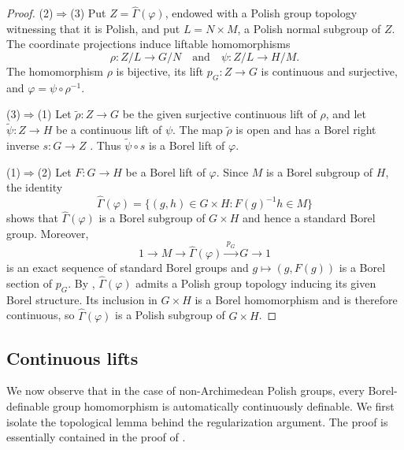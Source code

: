\documentclass[12pt]{amsart}
\theoremstyle{definition}
\begin{document}
\begin{proof}
(2)$\Rightarrow $(3) Put $Z=\widehat{\Gamma }(\varphi )$, endowed with a
Polish group topology witnessing that it is Polish, and put $L=N\times M$, a
Polish normal subgroup of $Z$. The coordinate projections induce liftable
homomorphisms 
\begin{equation*}
\rho :Z/L\longrightarrow G/N\quad \text{and}\quad \psi :Z/L\longrightarrow
H/M.
\end{equation*}%
The homomorphism $\rho $ is bijective, its lift $p_{G}:Z\rightarrow G$ is
continuous and surjective, and $\varphi =\psi \circ \rho ^{-1}$.

(3)$\Rightarrow $(1) Let $\widetilde{\rho}:Z\rightarrow G$ be the given
surjective continuous lift of $\rho $, and let $\widetilde{\psi}%
:Z\rightarrow H$ be a continuous lift of $\psi $. The map $\widetilde{\rho}$
is open and has a Borel right inverse $s:G\rightarrow Z$ \cite[Lemma~1]%
{brown_extensions_1971}. Thus $\widetilde{\psi}\circ s$ is a Borel lift of $%
\varphi$.

(1)$\Rightarrow $(2) Let $F:G\rightarrow H$ be a Borel lift of $\varphi $.
Since $M$ is a Borel subgroup of $H$, the identity 
\begin{equation*}
\widehat{\Gamma }(\varphi )=\{(g,h)\in G\times H:F(g)^{-1}h\in M\}
\end{equation*}%
shows that $\widehat{\Gamma }(\varphi )$ is a Borel subgroup of $G\times H$
and hence a standard Borel group. Moreover, 
\begin{equation*}
1\longrightarrow M\longrightarrow \widehat{\Gamma }(\varphi )%
\xrightarrow{\,p_G\,}G\longrightarrow 1
\end{equation*}%
is an exact sequence of standard Borel groups and $g\mapsto (g,F(g))$ is a
Borel section of $p_{G}$. By , $\widehat{\Gamma }%
(\varphi )$ admits a Polish group topology inducing its given Borel
structure. Its inclusion in $G\times H$ is a Borel homomorphism and is
therefore continuous, so $\widehat{\Gamma }(\varphi )$ is a Polish subgroup
of $G\times H$.
\end{proof}

\subsection{Continuous lifts}

We now observe that in the case of non-Archimedean Polish groups, every
Borel-definable group homomorphism is automatically continuously definable.
We first isolate the topological lemma behind the regularization argument.
The proof is essentially contained in the proof of \cite[Proposition~4.6]%
{bergfalk_definable_2024}.
\end{document}
